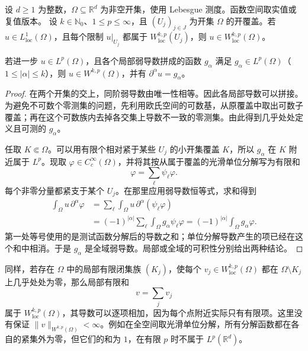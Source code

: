 \begin{proposition}\label{b1:prop:sobolev-local-gluing}
设 \(d\geq1\) 为整数，\(\Omega\subseteq\mathbb R^d\) 为非空开集，使用 Lebesgue 测度。函数空间取实值或复值版本。
设 \(k\in\mathbb N_0\)、\(1\le p\le\infty\)，且 \((U_j)_{j\in J}\) 为开集 \(\Omega\) 的开覆盖。若 \(u\in L^1_{\mathrm{loc}}(\Omega)\)，且每个限制 \(u|_{U_j}\) 都属于 \(W^{k,p}_{\mathrm{loc}}(U_j)\)，则 \(u\in W^{k,p}_{\mathrm{loc}}(\Omega)\)。

\ProseParagraphBreak

若进一步 \(u\in L^p(\Omega)\)，且各个局部弱导数拼成的函数 \(g_\alpha\) 满足 \(g_\alpha\in L^p(\Omega)\)（\(1\le|\alpha|\le k\)），则 \(u\in W^{k,p}(\Omega)\)，并有 \(\partial^\alpha u=g_\alpha\)。
\end{proposition}
\begin{proof}
在两个开集的交上，同阶弱导数由唯一性相等。因此各局部导数可以拼接。为避免不可数个零测集的问题，先利用欧氏空间的可数基，从原覆盖中取出可数子覆盖；再在这个可数族内去掉各交集上导数不一致的零测集。由此得到几乎处处定义且可测的 \(g_\alpha\)。

任取 \(K\Subset\Omega\)。可以用有限个相对紧于某些 \(U_j\) 的小开集覆盖 \(K\)，所以 \(g_\alpha\) 在 \(K\) 附近属于 \(L^p\)。现取 \(\varphi\in C_c^\infty(\Omega)\)，并将其按从属于覆盖的光滑单位分解写为有限和
\[
 \varphi=\sum_\ell\psi_\ell\varphi.
\]
每个非零分量都紧支于某个 \(U_j\)。在那里应用弱导数恒等式，求和得到
\[
 \begin{aligned}
 \int_\Omega u\,\partial^\alpha\varphi
 &=\sum_\ell\int_\Omega u\,\partial^\alpha(\psi_\ell\varphi)\\
 &=(-1)^{|\alpha|}\sum_\ell\int_\Omega g_\alpha\psi_\ell\varphi
 =(-1)^{|\alpha|}\int_\Omega g_\alpha\varphi.
 \end{aligned}
\]
第一处等号使用的是测试函数分解后的导数之和；单位分解导数产生的项已经在这个和中相消。于是 \(g_\alpha\) 是全域弱导数。局部或全域的可积性分别给出两种结论。
\end{proof}

同样，若存在 \(\Omega\) 中的局部有限闭集族 \((K_j)\)，使每个 \(v_j\in W^{k,p}_{\mathrm{loc}}(\Omega)\) 都在 \(\Omega\setminus K_j\) 上几乎处处为零，那么局部有限和
\[
 v=\sum_jv_j
\]
属于 \(W^{k,p}_{\mathrm{loc}}(\Omega)\)，其导数可以逐项相加，因为每个点附近实际只有有限项。这里没有保证 \(\|v\|_{W^{k,p}(\Omega)}<\infty\)。例如在全空间取光滑单位分解，所有分解函数都在各自的紧集外为零，但它们的和为 \(1\)，在有限 \(p\) 时不属于 \(L^p(\mathbb R^d)\)。

\ProseParagraphBreak

